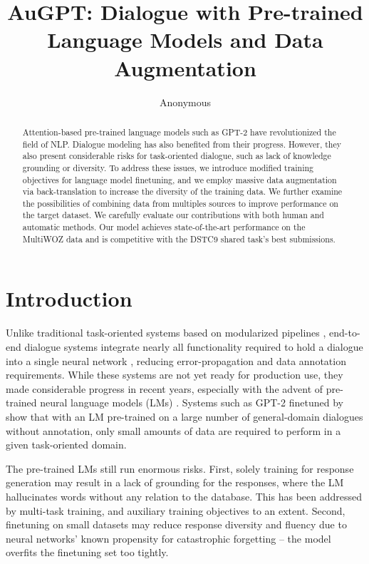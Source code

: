 \documentclass[letterpaper]{article} %
\title{AuGPT: Dialogue with Pre-trained Language Models and Data Augmentation}
\author {
    Anonymous \\
}
\begin{document}
\maketitle

\begin{abstract}
Attention-based pre-trained language models such as GPT-2 have revolutionized the field of NLP. Dialogue modeling has also benefited from their progress. However, they also present considerable risks for task-oriented dialogue, such as lack of knowledge grounding or diversity. To address these issues, we introduce modified training objectives for language model finetuning, and we employ massive data augmentation via back-translation to increase the diversity of the training data. We further examine the possibilities of combining data from multiples sources to improve performance on the target dataset. We carefully evaluate our contributions with both human and automatic methods. Our model achieves state-of-the-art performance on the MultiWOZ data and is competitive with the DSTC9 shared task's best submissions.
\end{abstract}
\section{Introduction}
Unlike traditional task-oriented systems based on modularized pipelines \cite{young2013, gao2018}, end-to-end dialogue systems integrate nearly all functionality required to hold a dialogue into a single neural network \cite{wen2017,manning2017,lei2018}, reducing error-propagation and data annotation requirements. While these systems are not yet ready for production use, they made considerable progress in recent years, especially with the advent of pre-trained neural language models (LMs) \cite{devlin2019,radford2019,zhang2020dialogpt}.
Systems such as GPT-2 finetuned by \citet{budzianowski2019} show that with an LM pre-trained on a large number of general-domain dialogues without annotation, only small amounts of data are required to perform in a given task-oriented domain.

The pre-trained LMs still run enormous risks. First, solely training for response generation may result in a lack of grounding for the responses, where the LM hallucinates words without any relation to the database. This has been addressed by multi-task training, and auxiliary training objectives \cite{peng2020} to an extent. Second, finetuning on small datasets may reduce response diversity and fluency due to neural networks' known propensity for catastrophic forgetting -- the model overfits the finetuning set too tightly.
\end{document}

